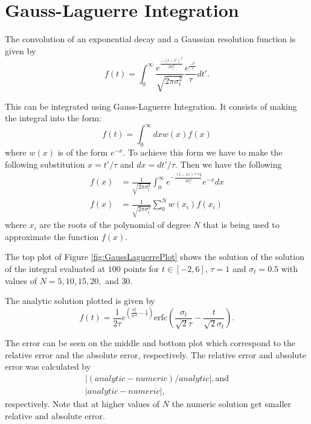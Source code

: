 \section{Gauss-Laguerre Integration}

The convolution of an exponential decay and a Gaussian resolution function is given by
\begin{equation}
    f(t)=\int^\infty_0 \frac{e^{\frac{-(t-t')^2}{2\sigma^2_t}}}{\sqrt{2\pi\sigma^2_t}}\frac{e^{\frac{-t'}{\tau}}}{\tau}dt'.
    \label{eq:convolution}
\end{equation}

This can be integrated using Gauss-Laguerre Integration. It consists of making the integral into the form:
\begin{equation}
    f(t)=\int^\infty_0 dx w(x) f(x)
\end{equation}
where $w(x)$ is of the form $e^{-x}$. To achieve this form we have to make the following substitution $x=t'/\tau$ and $dx=dt'/\tau$. Then we have the following
\begin{align*}
    f(x)&=\frac{1}{\sqrt{2\pi\sigma_t^2}}\int^\infty_0 e^{-\frac{(t-x\tau)**2}{2\sigma_t^2}}e^{-x} dx\\
    f(x)&=\frac{1}{\sqrt{2\pi\sigma_t^2}}\sum_0^N w(x_i)f(x_i)
\end{align*}
where $x_i$ are the roots of the polynomial of degree $N$ that is being used to approximate the function $f(x)$.

The top plot of Figure \ref{fig:GaussLaguerrePlot} shows the solution of the solution of the integral evaluated at $100$ points for $t\in[-2,6]$, $\tau=1$ and $\sigma_t=0.5$ with values of $N=5,10,15,20,$ and $30$. 

The analytic solution plotted is given by
\begin{equation}
    f(t)=\frac{1}{2\tau}e^{\left(\frac{\sigma^2_t}{2\tau^2}-\frac{t}{\tau}\right)}\mathrm{erfc}\left(\frac{\sigma_t}{\sqrt{2}\tau}-\frac{t}{\sqrt{2}\sigma_t}\right).
    \label{eq:convAnalytic}
\end{equation}

The error can be seen on the middle and bottom plot which correspond to the relative error and the absolute error, respectively. The relative error and absolute error was calculated by 
\begin{align*}
    |(analytic-numeric)/analytic|, \mathrm{and}\\
    |analytic-numeric|,
\end{align*}
respectively. Note that at higher values of $N$ the numeric solution get smaller relative and absolute error.

